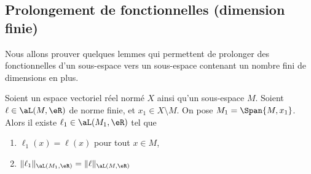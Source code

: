\subsection{Prolongement de fonctionnelles (dimension finie)}

Nous allons prouver quelques lemmes qui permettent de prolonger des fonctionnelles d'un sous-espace vers un sous-espace contenant un nombre fini de dimensions en plus.

\begin{lemma}     \label{LEMooHWSJooGVmIPV}
    Soient un espace vectoriel réel normé \( X\) ainsi qu'un sous-espace \( M\). Soient \( \ell\in\aL(M,\eR)\) de norme finie, et \( x_1\in X\setminus M\). On pose \( M_1=\Span\{ M, x_1 \}\). Alors il existe \( \ell_1\in\aL(M_1,\eR)\) tel que
    \begin{enumerate}
        \item
              \( \ell_1(x)=\ell(x)\) pour tout \( x\in M\),
        \item
              \( \| \ell_1 \|_{\aL(M_1,\eR)}=\| \ell \|_{\aL(M,\eR)}\)
    \end{enumerate}
\end{lemma}


